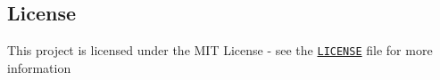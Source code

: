 \subsection*{License}

This project is licensed under the M\+IT License -\/ see the \href{https://github.com/heroufenix/image-processing-using-c/blob/master/LICENSE}{\tt L\+I\+C\+E\+N\+SE} file for more information 